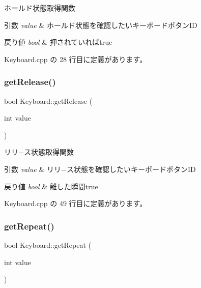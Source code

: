 ホールド状態取得関数 


\begin{DoxyParams}{引数}
{\em value} & ホールド状態を確認したいキーボードボタン\+ID \\
\hline
\end{DoxyParams}

\begin{DoxyRetVals}{戻り値}
{\em bool} & 押されていればtrue \\
\hline
\end{DoxyRetVals}


 Keyboard.\+cpp の 28 行目に定義があります。

\mbox{\label{class_keyboard_a03fa7ef22c90afaad27fc79fd1d7235c}} 
\subsubsection{\texorpdfstring{get\+Release()}{getRelease()}}
{\footnotesize\ttfamily bool Keyboard\+::get\+Release (\begin{DoxyParamCaption}\item[{int}]{value }\end{DoxyParamCaption})}



リリ−ス状態取得関数 


\begin{DoxyParams}{引数}
{\em value} & リリ−ス状態を確認したいキーボードボタン\+ID \\
\hline
\end{DoxyParams}

\begin{DoxyRetVals}{戻り値}
{\em bool} & 離した瞬間true \\
\hline
\end{DoxyRetVals}


 Keyboard.\+cpp の 49 行目に定義があります。

\mbox{\label{class_keyboard_aafeebcebd37ed0652a52b40c43c15a3b}} 
\subsubsection{\texorpdfstring{get\+Repeat()}{getRepeat()}}
{\footnotesize\ttfamily bool Keyboard\+::get\+Repeat (\begin{DoxyParamCaption}\item[{int}]{value }\end{DoxyParamCaption})}



